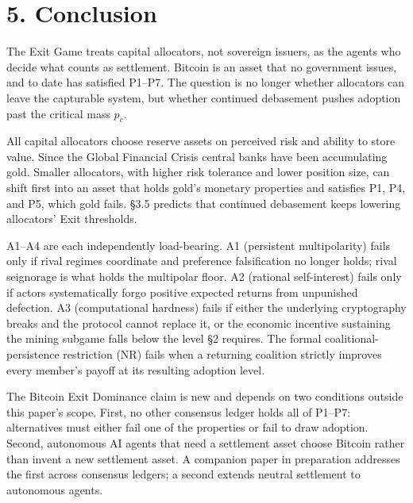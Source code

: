 \documentclass[12pt]{article}
\theoremstyle{definition}
\theoremstyle{remark}
\begin{document}

\section{5. Conclusion}

The Exit Game treats capital allocators, not sovereign issuers, as the agents who decide what counts as settlement. Bitcoin is an asset that no government issues, and to date has satisfied P1--P7. The question is no longer whether allocators can leave the capturable system, but whether continued debasement pushes adoption past the critical mass $p_c$.

All capital allocators choose reserve assets on perceived risk and ability to store value. Since the Global Financial Crisis central banks have been accumulating gold. Smaller allocators, with higher risk tolerance and lower position size, can shift first into an asset that holds gold's monetary properties and satisfies P1, P4, and P5, which gold fails. \S3.5 predicts that continued debasement keeps lowering allocators' Exit thresholds.

A1--A4 are each independently load-bearing. A1 (persistent multipolarity) fails only if rival regimes coordinate and preference falsification no longer holds; rival seignorage is what holds the multipolar floor. A2 (rational self-interest) fails only if actors systematically forgo positive expected returns from unpunished defection. A3 (computational hardness) fails if either the underlying cryptography breaks and the protocol cannot replace it, or the economic incentive sustaining the mining subgame falls below the level §2 requires. The formal coalitional-persistence restriction (NR) fails when a returning coalition strictly improves every member's payoff at its resulting adoption level.

The Bitcoin Exit Dominance claim is new and depends on two conditions outside this paper's scope. First, no other consensus ledger holds all of P1--P7: alternatives must either fail one of the properties or fail to draw adoption. Second, autonomous AI agents that need a settlement asset choose Bitcoin rather than invent a new settlement asset. A companion paper in preparation addresses the first across consensus ledgers; a second extends neutral settlement to autonomous agents.
\end{document}
